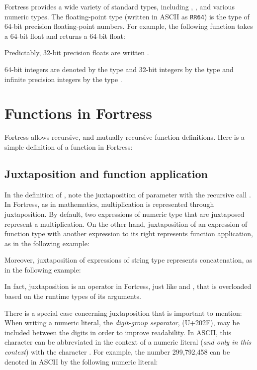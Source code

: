 Fortress provides a wide variety of standard types, including
, , and various numeric types.
The floating-point type  (written in ASCII as \verb$RR64$)
is the type of 64-bit precision floating-point numbers.
For example, the following function takes a 64-bit
 float and returns a 64-bit float:


Predictably, 32-bit precision floats are written .

64-bit integers are denoted by the type  and
32-bit integers by the type 
and infinite precision integers by the type .

\section{Functions in Fortress}
Fortress allows recursive, and mutually recursive function definitions.
Here is a simple definition of a  function in Fortress:



\subsection{Juxtaposition and function application}

In the definition of ,
note the juxtaposition of parameter  with the recursive
call .
In Fortress, as in mathematics,
multiplication is represented through juxtaposition.
By default,
two expressions of numeric type that are juxtaposed
represent a multiplication.
On the other hand,
juxtaposition of an expression of function type
with another expression to its right
represents function application,
as in the following example:



Moreover, juxtaposition of expressions of string type
represents concatenation, as in the following example:



In fact, juxtaposition is an operator in Fortress,
just like \EXP{+} and \EXP{-},
that is overloaded based on the runtime types of its arguments.

There is a special case concerning juxtaposition that is important to mention:
When writing a numeric literal, the \emph{digit-group separator},
 (U+202F),
may be included between the digits in order to improve readability.
In ASCII,
this character can be abbreviated in the context of a numeric literal
(\emph{and only in this context}) with the character .
For example, the number 299,792,458 can be denoted in ASCII by the
following numeric literal:

